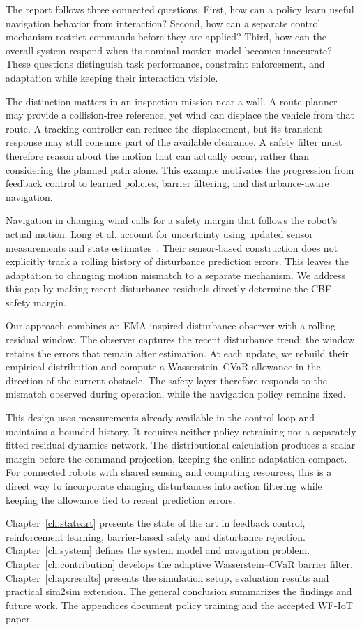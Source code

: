 The report follows three connected questions. First, how can a policy learn useful navigation behavior from interaction? Second, how can a separate control mechanism restrict commands before they are applied? Third, how can the overall system respond when its nominal motion model becomes inaccurate? These questions distinguish task performance, constraint enforcement, and adaptation while keeping their interaction visible.

The distinction matters in an inspection mission near a wall. A route planner may provide a collision-free reference, yet wind can displace the vehicle from that route. A tracking controller can reduce the displacement, but its transient response may still consume part of the available clearance. A safety filter must therefore reason about the motion that can actually occur, rather than considering the planned path alone. This example motivates the progression from feedback control to learned policies, barrier filtering, and disturbance-aware navigation.

Navigation in changing wind calls for a safety margin that follows the robot's actual motion. Long et al. account for uncertainty using updated sensor measurements and state estimates~\cite{long2024sensor}. Their sensor-based construction does not explicitly track a rolling history of disturbance prediction errors. This leaves the adaptation to changing motion mismatch to a separate mechanism. We address this gap by making recent disturbance residuals directly determine the CBF safety margin.

Our approach combines an EMA-inspired disturbance observer with a rolling residual window. The observer captures the recent disturbance trend; the window retains the errors that remain after estimation. At each update, we rebuild their empirical distribution and compute a Wasserstein--CVaR allowance in the direction of the current obstacle. The safety layer therefore responds to the mismatch observed during operation, while the navigation policy remains fixed.

This design uses measurements already available in the control loop and maintains a bounded history. It requires neither policy retraining nor a separately fitted residual dynamics network. The distributional calculation produces a scalar margin before the command projection, keeping the online adaptation compact. For connected robots with shared sensing and computing resources, this is a direct way to incorporate changing disturbances into action filtering while keeping the allowance tied to recent prediction errors.

Chapter~\ref{ch:stateart} presents the state of the art in feedback control, reinforcement learning, barrier-based safety and disturbance rejection. Chapter~\ref{ch:system} defines the system model and navigation problem. Chapter~\ref{ch:contribution} develops the adaptive Wasserstein--CVaR barrier filter. Chapter~\ref{chap:results} presents the simulation setup, evaluation results and practical sim2sim extension. The general conclusion summarizes the findings and future work. The appendices document policy training and the accepted WF-IoT paper.
\endgroup
